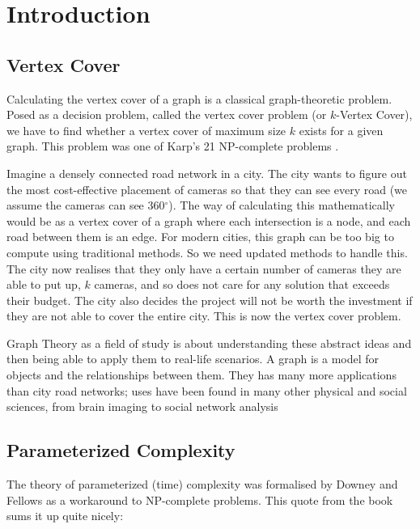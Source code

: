 \section{Introduction}

\subsection{Vertex Cover}

Calculating the vertex cover of a graph is a classical graph-theoretic problem.
Posed as a decision problem, called the vertex cover problem (or \(k\)-Vertex
Cover), we have to find whether a vertex cover of maximum size \(k\) exists for
a given graph. This problem was one of Karp's 21 NP-complete problems
\cite{karp1972reducibility}.

Imagine a densely connected road network in a city. The city wants to figure
out the most cost-effective placement of cameras so that they can see every
road (we assume the cameras can see 360\(^\circ\)). The way of calculating this
mathematically would be as a vertex cover of a graph where each intersection is
a node, and each road between them is an edge. For modern cities, this graph
can be too big to compute using traditional methods. So we need updated methods
to handle this. The city now realises that they only have a certain number of
cameras they are able to put up, \(k\) cameras, and so does not care for any
solution that exceeds their budget. The city also decides the project will not
be worth the investment if they are not able to cover the entire city. This is
now the vertex cover problem.

Graph Theory as a field of study is about understanding these abstract ideas
and then being able to apply them to real-life scenarios. A graph is a model
for objects and the relationships between them. They has many more applications
than city road networks; uses have been found in many other physical and social
sciences, from brain imaging \cite{vecchio2016brain} to social network analysis
\cite{grandjean2016social}

\subsection{Parameterized Complexity}

The theory of parameterized (time) complexity was formalised by Downey and
Fellows \cite{downey1999parameterized} as a workaround to NP-complete problems.
This quote from the book sums it up quite nicely:

